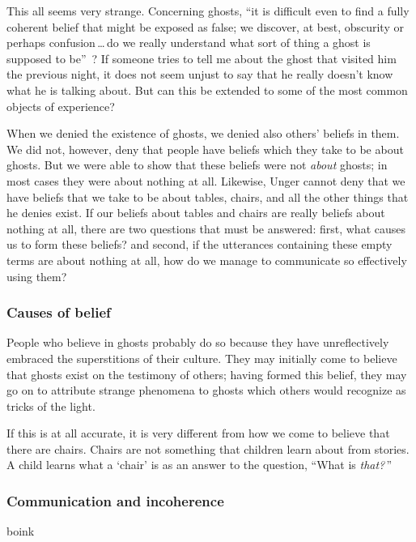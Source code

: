 \documentclass[11pt]{article}
\begin{document}
\begin{spacing}{1.5}
This all seems very strange. Concerning ghosts, ``it is difficult even to find a fully coherent belief that might be exposed as false; we discover, at best, obscurity or perhaps confusion\,\ldots\,do we really understand what sort of thing a ghost is supposed to be''~\citep[76]{stroud2000a}? If someone tries to tell me about the ghost that visited him the previous night, it does not seem unjust to say that he really doesn't know what he is talking about. But can this be extended to some of the most common objects of experience?

When we denied the existence of ghosts, we denied also others' beliefs in them. We did not, however, deny that people have beliefs which they take to be about ghosts. But we were able to show that these beliefs were not {\em about} ghosts; in most cases they were about nothing at all. Likewise, Unger cannot deny that we have beliefs that we take to be about tables, chairs, and all the other things that he denies exist. If our beliefs about tables and chairs are really beliefs about nothing at all, there are two questions that must be answered: first, what causes us to form these beliefs? and second, if the utterances containing these empty terms are about nothing at all, how do we manage to communicate so effectively using them?

\subsubsection{Causes of belief}
\label{unger-cause}
People who believe in ghosts probably do so because they have unreflectively embraced the superstitions of their culture. They may initially come to believe that ghosts exist on the testimony of others; having formed this belief, they may go on to attribute strange phenomena to ghosts which others would recognize as tricks of the light.

If this is at all accurate, it is very different from how we come to believe that there are chairs. Chairs are not something that children learn about from stories. A child learns what a `chair' is as an answer to the question, ``What is {\em that?}\,''

\subsubsection{Communication and incoherence}
\label{unger-comm}
boink

\ifstandalone
\end{spacing}


\fi
\end{document}
